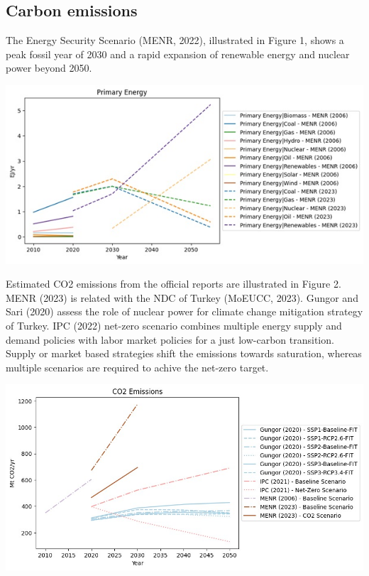 \documentclass[a0,portrait]{a0poster}
\begin{document}
\begin{multicols}{3}

\section{Carbon emissions}

The Energy Security Scenario (MENR, 2022), illustrated in Figure 1, shows a peak fossil year of 2030 and a rapid expansion of renewable energy and nuclear power beyond 2050. 

\begin{center}\vspace{1cm}
    \includegraphics[width=1.0\linewidth]{Figure_1}
\end{center}\vspace{1cm}

Estimated CO2 emissions from the official reports are illustrated in Figure 2. MENR (2023) is related with the NDC of Turkey (MoEUCC, 2023). Gungor and Sari (2020) assess the role of nuclear power for climate change mitigation strategy of Turkey. IPC (2022) net-zero scenario combines multiple energy supply and demand policies with labor market policies for a just low-carbon transition. Supply or market based strategies shift the emissions towards saturation, whereas multiple scenarios are required to achive the net-zero target. 

\begin{center}\vspace{1cm}
    \includegraphics[width=1.0\linewidth]{Figure_2}
\end{center}\vspace{1cm}


\end{multicols}
\end{document}
